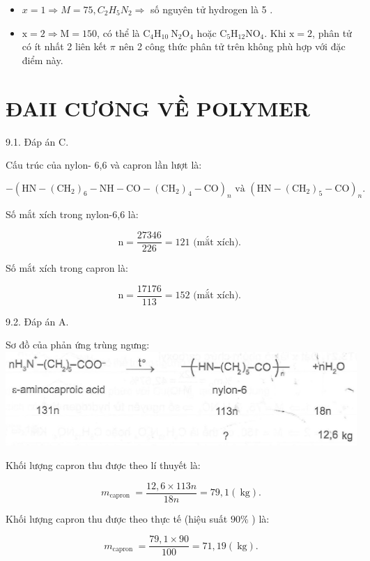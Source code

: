 \documentclass[10pt]{article}
\begin{document}
\begin{itemize}
  \item $x=1 \Rightarrow M=75, C_{2} H_{5} N_{2} \Rightarrow$ số nguyên tử hydrogen là 5 .
  \item $\mathrm{x}=2 \Rightarrow \mathrm{M}=150$, có thể là $\mathrm{C}_{4} \mathrm{H}_{10} \mathrm{~N}_{2} \mathrm{O}_{4}$ hoặc $\mathrm{C}_{5} \mathrm{H}_{12} \mathrm{NO}_{4}$. Khi $\mathrm{x}=2$, phân tử có ít nhất 2 liên kết $\pi$ nên 2 công thức phân tử trên không phù hợp với đặc điểm này.
\end{itemize}

\section*{ĐAII CƯƠNG VỀ POLYMER}
9.1. Đáp án C.

Cấu trúc của nylon- 6,6 và capron lần lượt là:

$$
-\left(\mathrm{HN}-\left(\mathrm{CH}_{2}\right)_{6}-\mathrm{NH}-\mathrm{CO}-\left(\mathrm{CH}_{2}\right)_{4}-\mathrm{CO}\right)_{n} \text { và }\left(\mathrm{HN}-\left(\mathrm{CH}_{2}\right)_{5}-\mathrm{CO}\right)_{n} \text {. }
$$

Số mắt xích trong nylon-6,6 là:

$$
\mathrm{n}=\frac{27346}{226}=121 \text { (mắt xích). }
$$

Số mắt xích trong capron là:

$$
\mathrm{n}=\frac{17176}{113}=152 \text { (mắt xích). }
$$

9.2. Đáp án A.

Sơ đồ của phản ứng trùng ngưng:\\
\includegraphics[max width=\textwidth, center]{2025_10_23_b4e16b74380d0f7e7700g-059}

Khối lượng capron thu được theo lí thuyết là:

$$
m_{\text {capron }}=\frac{12,6 \times 113 n}{18 n}=79,1(\mathrm{~kg}) .
$$

Khối lượng capron thu được theo thực tế (hiệu suất $90 \%$ ) là:

$$
m_{\text {capron }}=\frac{79,1 \times 90}{100}=71,19(\mathrm{~kg}) .
$$
\end{document}
